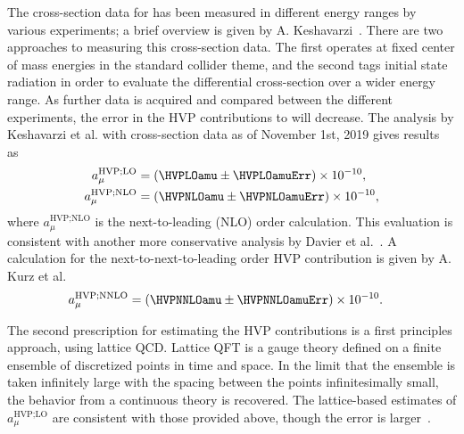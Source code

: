 The cross-section data for  has been measured in different energy ranges by various experiments; a brief overview is given by A. Keshavarzi~\cite{HadronDataOverview}. There are two approaches to measuring this cross-section data. The first operates at fixed center of mass energies in the standard collider theme, and the second tags initial state radiation in order to evaluate the differential cross-section over a wider energy range. As further data is acquired and compared between the different experiments, the error in the HVP contributions to \amu will decrease. The analysis by Keshavarzi et al. with cross-section data as of November 1st, 2019 gives results as~\cite{Keshavarzi:2018mgv,Keshavarzi:2019abf}
		\begin{equation}
		\begin{aligned}
            a_{\mu}^{\text{HVP;LO}} &= (\HVPLOamu \pm \HVPLOamuErr) \times 10^{-10}, \\
            a_{\mu}^{\text{HVP;NLO}} &= (\HVPNLOamu \pm \HVPNLOamuErr) \times 10^{-10}, 
		\end{aligned}
		\end{equation}
where $a_{\mu}^{\text{HVP;NLO}}$ is the next-to-leading (NLO) order calculation. This evaluation is consistent with another more conservative analysis by Davier et al.~\cite{HVP2,Davier:2019can}. A calculation for the next-to-next-to-leading order HVP contribution is given by A. Kurz et al.~\cite{Kurz:2014wya}
		\begin{equation}
		\begin{aligned}
            a_{\mu}^{\text{HVP;NNLO}} &= (\HVPNNLOamu \pm \HVPNNLOamuErr) \times 10^{-10}. 
		\end{aligned}
		\end{equation}



The second prescription for estimating the HVP contributions is a first principles approach, using lattice QCD. Lattice QFT is a gauge theory defined on a finite ensemble of discretized points in time and space. In the limit that the ensemble is taken infinitely large with the spacing between the points infinitesimally small, the behavior from a continuous theory is recovered. The lattice-based estimates of $a_{\mu}^{\text{HVP;LO}}$ are consistent with those provided above, though the error is larger~\cite{Lattice}. 

